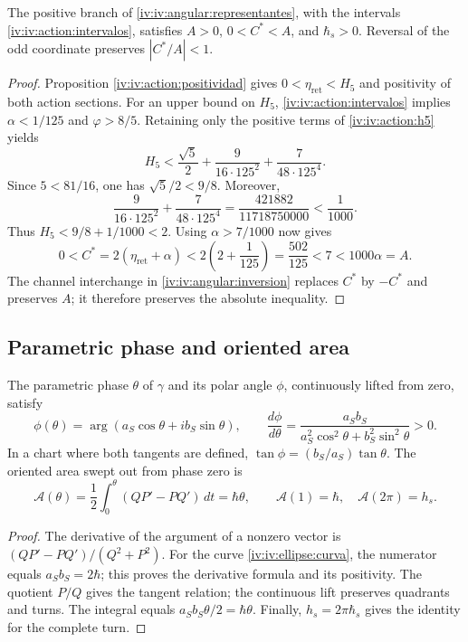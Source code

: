 \begin{proposition}
\label{iv:iv:ellipse:pertenencia}
The positive branch of \eqref{iv:iv:angular:representantes}, with the
intervals \eqref{iv:iv:action:intervalos}, satisfies
\(A>0\), \(0<C^*<A\), and \(\hbar_s>0\).
Reversal of the odd coordinate preserves \(|C^*/A|<1\).
\end{proposition}
\begin{proof}
Proposition \ref{iv:iv:action:positividad} gives
\(0<\eta_{\mathrm{ret}}<H_5\) and positivity of both
action sections. For an upper bound on \(H_5\),
\eqref{iv:iv:action:intervalos} implies
\(\alpha<1/125\) and \(\varphi>8/5\). Retaining only
the positive terms of \eqref{iv:iv:action:h5} yields
\[
 H_5<
 \frac{\sqrt5}{2}+
 \frac{9}{16\cdot125^2}+
 \frac{7}{48\cdot125^4}.
\]
Since \(5<81/16\), one has \(\sqrt5/2<9/8\). Moreover,
\[
 \frac{9}{16\cdot125^2}+
 \frac{7}{48\cdot125^4}
 =\frac{421882}{11718750000}<\frac1{1000}.
\]
Thus \(H_5<9/8+1/1000<2\). Using
\(\alpha>7/1000\) now gives
\[
 0<C^*=2(\eta_{\mathrm{ret}}+\alpha)
 <2\left(2+\frac1{125}\right)=\frac{502}{125}
 <7<1000\alpha=A.
\]
The channel interchange in
\ref{iv:iv:angular:inversion} replaces \(C^*\) by \(-C^*\)
and preserves \(A\); it therefore preserves the absolute inequality.
\end{proof}

\subsection{Parametric phase and oriented area}
\label{iv:iv:ellipse:area}

\begin{proposition}
\label{iv:iv:ellipse:ley-areal}
The parametric phase \(\theta\) of \(\gamma\) and its polar
angle \(\phi\), continuously lifted from zero, satisfy
\begin{equation}
 \phi(\theta)=\arg(a_S\cos\theta+i b_S\sin\theta),\qquad
 \frac{d\phi}{d\theta}
 =\frac{a_Sb_S}{a_S^2\cos^2\theta+b_S^2\sin^2\theta}>0.
 \label{iv:iv:ellipse:fases}
\end{equation}
In a chart where both tangents are defined,
\(\tan\phi=(b_S/a_S)\tan\theta\). The oriented area swept out
from phase zero is
\begin{equation}
 \mathcal A(\theta)=
 \frac12\int_0^\theta(QP'-PQ')\,dt=\hbar\theta,
 \qquad
 \mathcal A(1)=\hbar,\quad\mathcal A(2\pi)=h_s.
 \label{iv:iv:ellipse:area-fase}
\end{equation}
\end{proposition}
\begin{proof}
The derivative of the argument of a nonzero vector is
\((QP'-PQ')/(Q^2+P^2)\). For the curve
\eqref{iv:iv:ellipse:curva}, the numerator equals
\(a_Sb_S=2\hbar\); this proves the derivative formula and its
positivity. The quotient \(P/Q\) gives the tangent relation;
the continuous lift preserves quadrants and turns.
The integral equals \(a_Sb_S\theta/2=\hbar\theta\).
Finally, \(h_s=2\pi\hbar_s\) gives the identity for
the complete turn.
\end{proof}

